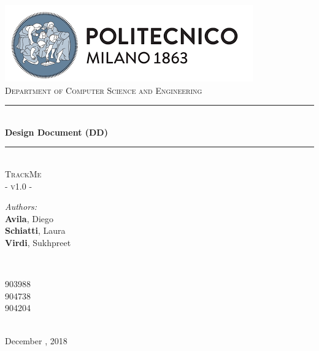 \documentclass[a4paper, hidelinks, 12pt]{report}
\begin{document}
	\begin{titlepage}
		\centering
		\vspace*{0.7 cm}
		\includegraphics[scale = 0.85]{../Assets/PolimiLogo.png}\\[1.6 cm]
		\textsc{\large Department of Computer Science and Engineering}\\[1.8 cm]
		
		\rule{\linewidth}{0.2 mm} \\[0.4 cm]
		{ \huge \bfseries Design Document (DD)}\\
		\rule{\linewidth}{0.2 mm} \\[1.5 cm]
		
		\textsc{\Large TrackMe}\\[0.5 cm]
		\textsc{\large - v1.0 -}\\[1 cm]
		
		\begin{minipage}{0.4\textwidth}
			\begin{flushleft} \large
				\emph{Authors:}\\
				\textbf{Avila}, Diego \\
				\textbf{Schiatti}, Laura \\
				\textbf{Virdi}, Sukhpreet
			\end{flushleft}
		\end{minipage}~
		\begin{minipage}{0.4\textwidth}
			\begin{flushright} \large
				903988 \\
				904738 \\
				904204
			\end{flushright}
		\end{minipage}\\[2 cm]
		
		{\large December  , 2018}\\[2 cm]
		
		\vfill
	\end{titlepage}
	
	\tableofcontents
	\newpage
	\listoffigures
	\listoftables
	\clearpage
	\setcounter{page}{1}
	
\end{document}
